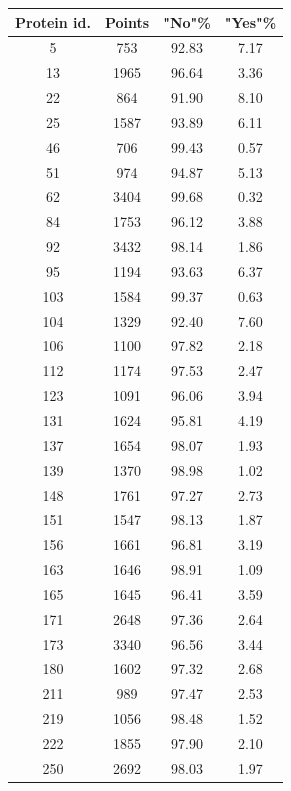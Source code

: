 \documentclass[%
 aip,
 jmp,%
 amsmath,amssymb,
 reprint,%
]{revtex4-1}
\begin{document}
\begin{center}
	\begin{tabular}{|c|c|c|c|}
	     \hline
	     \textbf{Protein id.} & \textbf{Points} & \textbf{"No"\%} & \textbf{"Yes"\%} \\
	   	 \hline
	   	 5   &     753 &92.83 &7.17\\
        13   &   1965& 96.64 &3.36\\
        \hline
        22   &    864 &91.90 &8.10\\
        \hline
        25    &  1587 &93.89 &6.11\\
        \hline
        46   &    706 &99.43 &0.57\\
        \hline
        51   &    974 &94.87 &5.13\\
        \hline
        62   &   3404 &99.68 &0.32\\
        \hline
        84   &   1753 &96.12 &3.88\\
        \hline
        92   &   3432 &98.14 &1.86\\
        \hline
        95   &   1194 &93.63 &6.37\\
        \hline
        103     &1584 &99.37 &0.63\\
        \hline
        104     &1329 &92.40 &7.60\\
        \hline
        106     &1100 &97.82 &2.18\\
        \hline
        112     &1174 &97.53 &2.47\\
        \hline
        123     &1091 &96.06 &3.94\\
        \hline
        131     &1624 &95.81 &4.19\\
        \hline
        137     &1654 &98.07 &1.93\\
        \hline
        139     &1370 &98.98 &1.02\\
        \hline
        148     &1761 &97.27 &2.73\\
        \hline
        151     &1547 &98.13 &1.87\\
        \hline
        156     &1661 &96.81 &3.19\\
        \hline
        163     &1646 &98.91 &1.09\\
        \hline
        165     &1645 &96.41 &3.59\\
        \hline
        171     &2648 &97.36 &2.64\\
        \hline
        173     &3340 &96.56 &3.44\\
        \hline
        180     &1602 &97.32 &2.68\\
        \hline
        211     & 989 &97.47 &2.53\\
        \hline
        219     &1056 &98.48 &1.52\\
        \hline
        222     &1855 &97.90 &2.10\\
        \hline
        250     &2692 &98.03 &1.97\\
        \hline
	\end{tabular}
\end{center}
\end{document}
